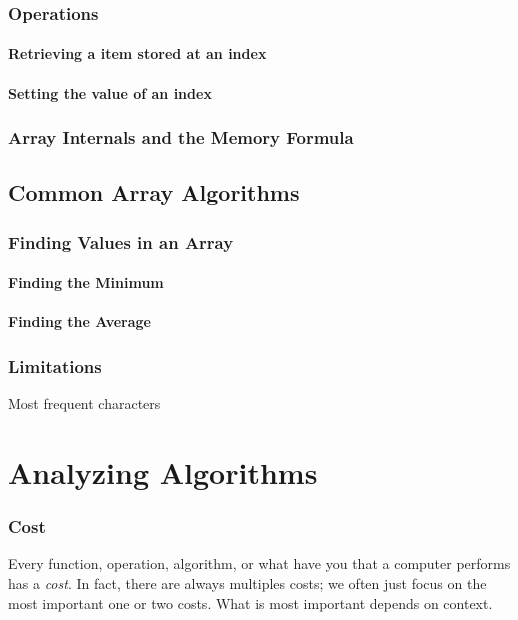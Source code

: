 \documentclass[10pt,a4paper]{book}
\begin{document}
\subsection{Operations}

\subsubsection{Retrieving a item stored at an index}

\subsubsection{Setting the value of an index}

\subsection{Array Internals and the Memory Formula}

\section{Common Array Algorithms}

\subsection{Finding Values in an Array}
\subsubsection{Finding the Minimum}

\subsubsection{Finding the Average}


\subsection{Limitations}
Most frequent characters



\chapter{Analyzing Algorithms}

\subsection{Cost}
Every function, operation, algorithm, or what have you that a computer performs has a \emph{cost}. In fact, there are always multiples costs;  we often just focus on the most important one or two costs.  
What is most important depends on context.
\end{document}
